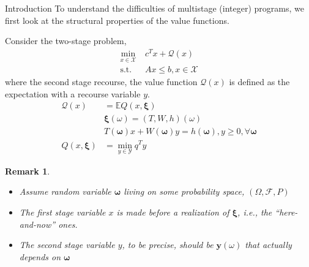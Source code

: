 \documentclass{beamerswitch}
\newcommand{\st}{\mathrm{s.t.\;}}
\newcommand{\ex}{\mathbb E}
\newcommand{\bxi}{\bm \xi}
\newcommand{\bo}{\bm \omega}
\newtheorem{remark}[thm]{Remark}
\begin{document}
\begin{frame}[allowframebreaks]{Introduction}
    To understand the difficulties of multistage (integer) programs, we first look at the structural properties of the value functions.

    Consider the two-stage problem,
    \begin{align*}
        \min_{x \in \mathcal X }~ & c^T x+ \mathcal Q (x)        \\
        \st                       & A x \leq b, x \in \mathcal X
    \end{align*}
    where the second stage recourse, the value function \(\mathcal Q (x) \) is defined as the expectation with a recourse variable \(y\).
    \begin{align*}
        \mathcal Q (x) & = \ex Q(x, \bxi)                                \\
                       & \bxi(\omega)    = (T, W, h )(\omega)            \\
                       & T(\bo) x+W(\bo) y=h(\bo), y \geq 0, \forall \bo \\
        Q(x, \bxi)     & = \min_{y \in \mathcal Y} q^T y
    \end{align*}

    \begin{remark}
        \begin{itemize}
            \item Assume random variable \(\bo \) living on some probability space, \((\Omega,\mathcal F, P)\)
            \item The first stage variable \(x\) is made before a realization of \(\bxi\), i.e., the ``here-and-now'' ones.
            \item The second stage variable \(y\), to be precise, should be \(\bm y(\omega)\) that actually depends on \(\bo\)
        \end{itemize}
    \end{remark}
\end{frame}
\end{document}
